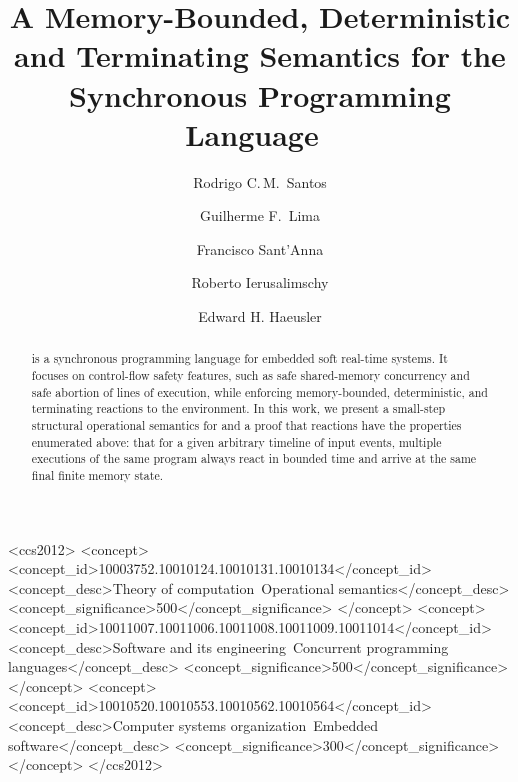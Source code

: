 \documentclass[sigplan,protrusion=true,expansion,screen]{acmart}
\begin{document}
\title[A Memory-Bounded, Deterministic and Terminating Semantics for~\CEU]
{A Memory-Bounded, Deterministic and Terminating Semantics for the
       Synchronous Programming Language~\CEU}

\author[R.\,C.\,M.~Santos]{Rodrigo C.\,M.~Santos}
%
\author[G.\,F.~Lima]{Guilherme F.~Lima}
%
\author[F.~Sant'Anna]{Francisco Sant'Anna}
%
\author[R.~Ierusalimschy]{Roberto Ierusalimschy}
%
\author[E.\,H.~Haeusler]{Edward H. Haeusler}

\begin{abstract}
\CEU is a synchronous programming language for embedded soft real-time systems.
%
It focuses on control-flow safety features, such as safe shared-memory
concurrency and safe abortion of lines of execution, while enforcing
memory-bounded, deterministic, and terminating reactions to the environment.
%
In this work, we present a small-step structural operational semantics for
\CEU and a proof that reactions have the properties enumerated above:
%
that for a given arbitrary timeline of input events, multiple executions of the
same program always react in bounded time and arrive at the same final finite
memory state.
%
\end{abstract}


\begin{CCSXML}
<ccs2012>
 <concept>
  <concept_id>10003752.10010124.10010131.10010134</concept_id>
  <concept_desc>Theory of computation~Operational semantics</concept_desc>
  <concept_significance>500</concept_significance>
 </concept>
 <concept>
  <concept_id>10011007.10011006.10011008.10011009.10011014</concept_id>
  <concept_desc>Software and its
                engineering~Concurrent programming languages</concept_desc>
  <concept_significance>500</concept_significance>
 </concept>
 <concept>
  <concept_id>10010520.10010553.10010562.10010564</concept_id>
  <concept_desc>Computer systems
                organization~Embedded software</concept_desc>
  <concept_significance>300</concept_significance>
 </concept>
</ccs2012>
\end{CCSXML}
\end{document}

